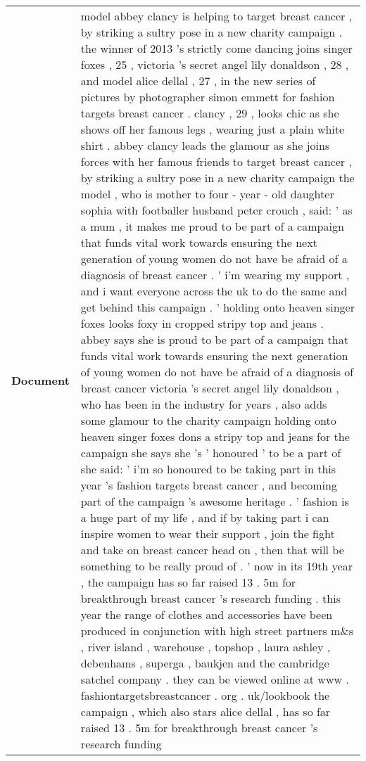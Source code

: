\documentclass[11pt,a4paper]{article}
\begin{document}
\begin{table*}[t]
    \centering
\begin{center}
    \begin{tabular}{|P{1.5cm}@{}| p{13.8cm}|}
    \hline
    \small \textbf{Document} &model abbey clancy is helping to target breast cancer ,  by striking a sultry pose in a new charity campaign .   the winner of 2013 's strictly come dancing joins singer foxes ,  25 ,  victoria 's secret angel lily donaldson ,  28 ,  and model alice dellal ,  27 ,  in the new series of pictures by photographer simon emmett for fashion targets breast cancer .   clancy ,  29 ,  looks chic as she shows off her famous legs ,  wearing just a plain white shirt .   abbey clancy leads the glamour as she joins forces with her famous friends to target breast cancer ,  by striking a sultry pose in a new charity campaign  the model ,  who is mother to four - year - old daughter sophia with footballer husband peter crouch ,  said: ' as a mum ,  it makes me proud to be part of a campaign that funds vital work towards ensuring the next generation of young women do not have be afraid of a diagnosis of breast cancer .  ' i'm wearing my support ,  and i want everyone across the uk to do the same and get behind this campaign .  ' holding onto heaven singer foxes looks foxy in cropped stripy top and jeans .   abbey says she is proud to be part of a campaign that funds vital work towards ensuring the next generation of young women do not have be afraid of a diagnosis of breast cancer  victoria 's secret angel lily donaldson ,  who has been in the industry for years ,  also adds some glamour to the charity campaign  holding onto heaven singer foxes dons a stripy top and jeans for the campaign she says she 's ' honoured ' to be a part of  she said: ' i'm so honoured to be taking part in this year 's fashion targets breast cancer ,  and becoming part of the campaign 's awesome heritage .  ' fashion is a huge part of my life ,  and if by taking part i can inspire women to wear their support ,  join the fight and take on breast cancer head on ,  then that will be something to be really proud of .  ' now in its 19th year ,  the campaign has so far raised 13 . 5m for breakthrough breast cancer 's research funding .   this year the range of clothes and accessories have been produced in conjunction with high street partners m\&s ,  river island ,  warehouse ,  topshop ,  laura ashley ,  debenhams ,  superga ,  baukjen and the cambridge satchel company .   they can be viewed online at www . fashiontargetsbreastcancer . org . uk/lookbook  the campaign ,  which also stars alice dellal ,  has so far raised 13 . 5m for breakthrough breast cancer 's research funding 


\end{tabular}
\end{center}
\end{table*}
\end{document}
